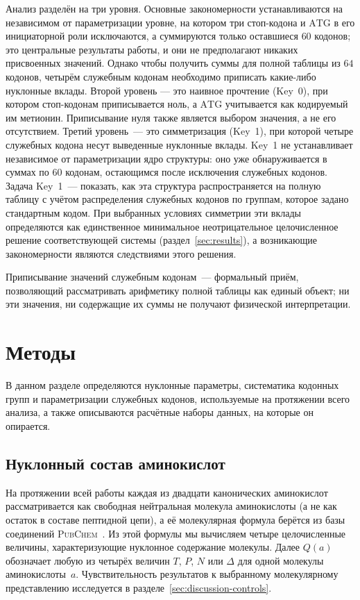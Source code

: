 \documentclass[11pt,a4paper]{article}
\renewcommand{\_}{\origunderscore\allowbreak}
\begin{document}
Анализ разделён на три уровня. Основные закономерности устанавливаются на независимом от параметризации уровне, на котором три стоп-кодона и $\mathrm{ATG}$ в его инициаторной роли исключаются, а суммируются только оставшиеся $60$ кодонов; это центральные результаты работы, и они не предполагают никаких присвоенных значений. Однако чтобы получить суммы для полной таблицы из $64$ кодонов, четырём служебным кодонам необходимо приписать какие-либо нуклонные вклады. Второй уровень --- это наивное прочтение (Key~0), при котором стоп-кодонам приписывается ноль, а $\mathrm{ATG}$ учитывается как кодируемый им метионин. Приписывание нуля также является выбором значения, а не его
отсутствием. Третий уровень~--- это симметризация (Key~1), при которой
четыре служебных кодона несут выведенные нуклонные вклады. Key~1 не
устанавливает независимое от параметризации ядро структуры: оно уже
обнаруживается в суммах по $60$ кодонам, остающимся после исключения
служебных кодонов. Задача Key~1~--- показать, как эта структура
распространяется на полную таблицу с учётом распределения служебных
кодонов по группам, которое задано стандартным кодом. При выбранных условиях
симметрии эти вклады определяются как единственное минимальное
неотрицательное целочисленное решение соответствующей системы
(раздел~\ref{sec:results}), а возникающие закономерности являются
следствиями этого решения.

Приписывание значений служебным кодонам~--- формальный приём,
позволяющий рассматривать арифметику полной таблицы как единый объект;
ни эти значения, ни содержащие их суммы не получают физической
интерпретации.

\section{Методы}
\label{sec:methods}

В данном разделе определяются нуклонные параметры, систематика
кодонных групп и параметризации служебных кодонов, используемые
на протяжении всего анализа, а также описываются расчётные
наборы данных, на которые он опирается.

\subsection{Нуклонный состав аминокислот}
\label{sec:composition}

На протяжении всей работы каждая из двадцати канонических аминокислот
рассматривается как свободная нейтральная молекула аминокислоты (а не
как остаток в составе пептидной цепи), а её молекулярная формула
берётся из базы соединений \textsc{PubChem}~\cite{kim2023}. Из этой
формулы мы вычисляем четыре целочисленные величины, характеризующие
нуклонное содержание молекулы. Далее $Q(a)$ обозначает любую из
четырёх величин $T$, $P$, $N$ или $\Delta$ для одной молекулы
аминокислоты~$a$. Чувствительность результатов к выбранному
молекулярному представлению исследуется в
разделе~\ref{sec:discussion-controls}.
\end{document}
